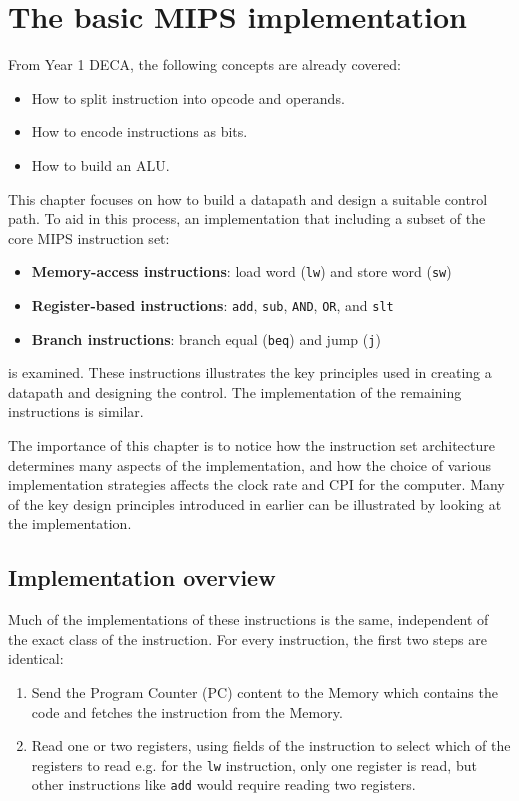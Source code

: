 \documentclass[10pt,a4paper]{article}
\begin{document}
\section{The basic MIPS implementation}

From Year 1 DECA, the following concepts are already covered:
\begin{itemize}
    \item How to split instruction into opcode and operands.
    \item How to encode instructions as bits.
    \item How to build an ALU.
\end{itemize}

This chapter focuses on how to build a datapath and design a suitable control path. To aid in this
process, an implementation that including a subset of the core MIPS instruction set:
\begin{itemize}
    \item \textbf{Memory-access instructions}: load word (\texttt{lw}) and store word (\texttt{sw})
    \item  \textbf{Register-based instructions}: \texttt{add}, \texttt{sub}, \texttt{AND},
    \texttt{OR}, and \texttt{slt}
    \item \textbf{Branch instructions}: branch equal (\texttt{beq}) and jump (\texttt{j})
\end{itemize}
is examined. These instructions illustrates the key principles used in creating a datapath and designing 
the control. The implementation of the remaining instructions is similar.

The importance of this chapter is to notice how the instruction set architecture determines many aspects of the implementation, and how the choice of various implementation strategies affects the clock rate and CPI 
for the computer.  Many of the key design principles introduced in earlier can be illustrated by
looking at the implementation.

\subsection{Implementation overview}

Much of the implementations of these instructions is the same, independent of the exact class of the
instruction. For every instruction, the first two steps are identical:
\begin{enumerate}
    \item Send the Program Counter (PC) content to the Memory which contains the code and 
    fetches the instruction from the Memory.
    \item Read one or two registers, using fields of the instruction to select which of the
    registers to read e.g. for the \texttt{lw} instruction, only one register is read, but other
    instructions like \texttt{add} would require reading two registers.
\end{enumerate}
\end{document}
